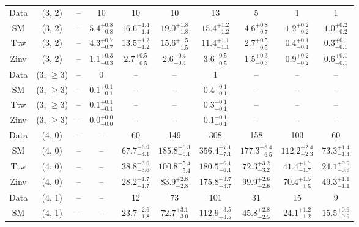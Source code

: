 \begin{table}[h!]
{\begin{tabular}{cccccccccc}
	Data & (3, 2) & -- & 10 & 10 & 10 & 13 & 5 & 1 & 1 \\[0.5ex] 
	SM & (3, 2) & -- & $5.4^{+ 0.8 }_{- 0.8 }$ & $16.6^{+ 1.4 }_{- 1.4 }$ & $19.0^{+ 1.8 }_{- 1.8 }$ & $15.4^{+ 1.2 }_{- 1.2 }$ & $4.6^{+ 0.8 }_{- 0.7 }$ & $1.2^{+ 0.2 }_{- 0.2 }$ & $1.0^{+ 0.2 }_{- 0.2 }$ \\[0.5ex] 
	Ttw & (3, 2) & -- & $4.3^{+ 0.7 }_{- 0.7 }$ & $13.5^{+ 1.2 }_{- 1.2 }$ & $15.6^{+ 1.5 }_{- 1.5 }$ & $11.4^{+ 1.1 }_{- 1.1 }$ & $2.7^{+ 0.5 }_{- 0.5 }$ & $0.4^{+ 0.1 }_{- 0.1 }$ & $0.3^{+ 0.1 }_{- 0.1 }$ \\[0.5ex] 
	Zinv & (3, 2) & -- & $1.1^{+ 0.3 }_{- 0.3 }$ & $2.7^{+ 0.5 }_{- 0.5 }$ & $2.6^{+ 0.4 }_{- 0.4 }$ & $3.6^{+ 0.5 }_{- 0.5 }$ & $1.5^{+ 0.3 }_{- 0.3 }$ & $0.9^{+ 0.2 }_{- 0.2 }$ & $0.6^{+ 0.1 }_{- 0.1 }$ \\[0.5ex] 
	Data & (3, $\ge3$) & -- & 0 & -- & -- & 1 & -- & -- & -- \\[0.5ex] 
	SM & (3, $\ge3$) & -- & $0.1^{+ 0.1 }_{- 0.1 }$ & -- & -- & $0.4^{+ 0.1 }_{- 0.1 }$ & -- & -- & -- \\[0.5ex] 
	Ttw & (3, $\ge3$) & -- & $0.1^{+ 0.1 }_{- 0.1 }$ & -- & -- & $0.3^{+ 0.1 }_{- 0.1 }$ & -- & -- & -- \\[0.5ex] 
	Zinv & (3, $\ge3$) & -- & $0.0^{+ 0.0 }_{- 0.0 }$ & -- & -- & $0.1^{+ 0.1 }_{- 0.1 }$ & -- & -- & -- \\[0.5ex] 
	Data & (4, 0) & -- & -- & 60 & 149 & 308 & 158 & 103 & 60 \\[0.5ex] 
	SM & (4, 0) & -- & -- & $67.7^{+ 6.9 }_{- 4.1 }$ & $185.8^{+ 6.3 }_{- 6.1 }$ & $356.4^{+ 7.1 }_{- 7.1 }$ & $177.3^{+ 8.4 }_{- 6.5 }$ & $112.2^{+ 2.4 }_{- 2.3 }$ & $73.3^{+ 1.4 }_{- 1.4 }$ \\[0.5ex] 
	Ttw & (4, 0) & -- & -- & $38.8^{+ 3.6 }_{- 3.6 }$ & $100.8^{+ 5.4 }_{- 5.4 }$ & $180.5^{+ 6.1 }_{- 6.1 }$ & $72.3^{+ 3.2 }_{- 3.2 }$ & $41.4^{+ 1.7 }_{- 1.7 }$ & $24.1^{+ 0.9 }_{- 0.9 }$ \\[0.5ex] 
	Zinv & (4, 0) & -- & -- & $28.2^{+ 1.7 }_{- 1.7 }$ & $83.9^{+ 2.8 }_{- 2.8 }$ & $175.8^{+ 3.7 }_{- 3.7 }$ & $99.9^{+ 2.6 }_{- 2.6 }$ & $70.4^{+ 1.5 }_{- 1.5 }$ & $49.3^{+ 1.1 }_{- 1.1 }$ \\[0.5ex] 
	Data & (4, 1) & -- & -- & 12 & 73 & 101 & 31 & 15 & 9 \\[0.5ex] 
	SM & (4, 1) & -- & -- & $23.7^{+ 2.6 }_{- 1.8 }$ & $72.7^{+ 3.1 }_{- 3.0 }$ & $112.9^{+ 3.5 }_{- 3.5 }$ & $45.8^{+ 2.8 }_{- 2.5 }$ & $24.1^{+ 1.2 }_{- 1.2 }$ & $15.5^{+ 0.9 }_{- 0.9 }$ \\[0.5ex] 

\end{tabular}}
\end{table}
